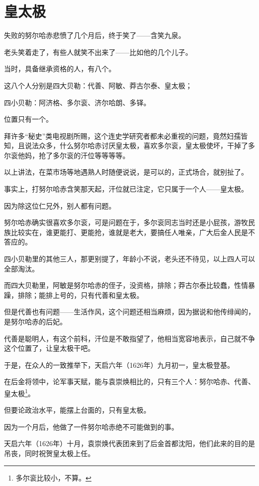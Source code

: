 \section{皇太极}
\ifnum{}
	\begin{multicols}{\theparacolNo}
		\fi
		失败的努尔哈赤悲愤了几个月后，终于笑了——含笑九泉。

		老头笑着走了，有些人就笑不出来了——比如他的几个儿子。

		当时，具备继承资格的人，有八个。

		这八个人分别是四大贝勒：代善、阿敏、莽古尔泰、皇太极；

		四小贝勒：阿济格、多尔衮、济尔哈朗、多铎。

		位置只有一个。

		拜许多“秘史”类电视剧所赐，这个连史学研究者都未必重视的问题，竟然妇孺皆知，且说法众多，什么努尔哈赤讨厌皇太极，喜欢多尔衮，皇太极使坏，干掉了多尔衮他妈，抢了多尔衮的汗位等等等等。

		以上讲法，在菜市场等地遇熟人时随便说说，是可以的，正式场合，就别扯了。

		事实上，打努尔哈赤含笑那天起，汗位就已注定，它只属于一个人——皇太极。

		因为除这位仁兄外，别人都有问题。

		努尔哈赤确实很喜欢多尔衮，可是问题在于，多尔衮同志当时还是小屁孩，游牧民族比较实在，谁更能打、更能抢，谁就是老大，要搞任人唯亲，广大后金人民是不答应的。

		四小贝勒里的其他三人，那更别提了，年龄小不说，老头还不待见，以上四人可以全部淘汰。

		而四大贝勒里，阿敏是努尔哈赤的侄子，没资格，排除；莽古尔泰比较蠢，性情暴躁，排除；能排上号的，只有代善和皇太极。

		但是代善也有问题——生活作风，这个问题还相当麻烦，因为据说和他传绯闻的，是努尔哈赤的后妃。

		代善是聪明人，有这个前科，汗位是不敢指望了，他相当宽容地表示，自己就不争这个位置了，让皇太极干吧。

		于是，在众人的一致推举下，天启六年（1626年）九月初一，皇太极登基。

		在后金将领中，论军事天赋，能与袁崇焕相比的，只有三个人：努尔哈赤、代善、皇太极\footnote{多尔衮比较小，不算。}。

		但要论政治水平，能摆上台面的，只有皇太极。

		因为一个月后，他做了一件努尔哈赤绝不可能做到的事。

		天启六年（1626年）十月，袁崇焕代表团来到了后金首都沈阳，他们此来的目的是吊丧，同时祝贺皇太极上任。


\end{multicols}
